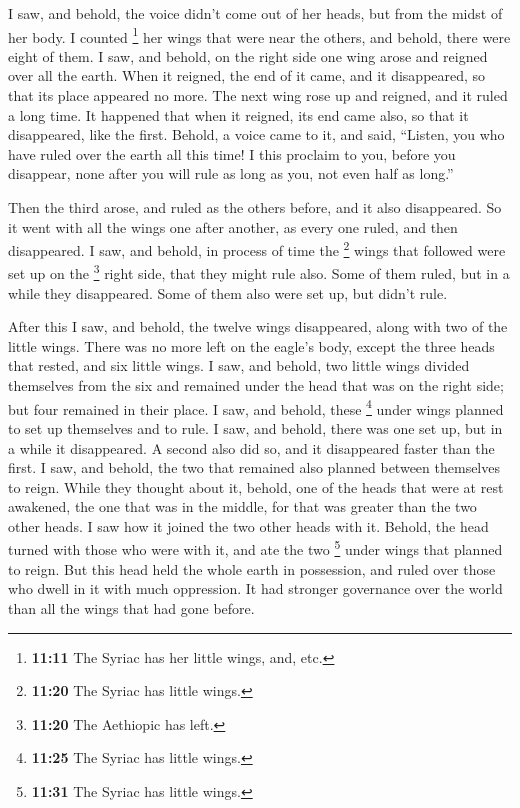  I saw, and behold, the voice didn't come out of her
heads, but from the midst of her body.  I counted
\footnote{\textbf{11:11} The Syriac has her little wings, and, etc.} her
wings that were near the others, and behold, there were eight of them.
 I saw, and behold, on the right side one wing arose and
reigned over all the earth.  When it reigned, the end of
it came, and it disappeared, so that its place appeared no more. The
next wing rose up and reigned, and it ruled a long time. 
It happened that when it reigned, its end came also, so that it
disappeared, like the first.  Behold, a voice came to it,
and said,  ``Listen, you who have ruled over the earth
all this time! I this proclaim to you, before you disappear,
 none after you will rule as long as you, not even half
as long.''

 Then the third arose, and ruled as the others before,
and it also disappeared.  So it went with all the wings
one after another, as every one ruled, and then disappeared.
 I saw, and behold, in process of time the \footnote{\textbf{11:20}
  The Syriac has little wings.} wings that followed were set up on the
\footnote{\textbf{11:20} The Aethiopic has left.} right side, that they
might rule also. Some of them ruled, but in a while they disappeared.
 Some of them also were set up, but didn't rule.

 After this I saw, and behold, the twelve wings
disappeared, along with two of the little wings.  There
was no more left on the eagle's body, except the three heads that
rested, and six little wings.  I saw, and behold, two
little wings divided themselves from the six and remained under the head
that was on the right side; but four remained in their place.
 I saw, and behold, these \footnote{\textbf{11:25} The
  Syriac has little wings.} under wings planned to set up themselves and
to rule.  I saw, and behold, there was one set up, but in
a while it disappeared.  A second also did so, and it
disappeared faster than the first.  I saw, and behold,
the two that remained also planned between themselves to reign.
 While they thought about it, behold, one of the heads
that were at rest awakened, the one that was in the middle, for that was
greater than the two other heads.  I saw how it joined
the two other heads with it.  Behold, the head turned
with those who were with it, and ate the two \footnote{\textbf{11:31}
  The Syriac has little wings.} under wings that planned to reign.
 But this head held the whole earth in possession, and
ruled over those who dwell in it with much oppression. It had stronger
governance over the world than all the wings that had gone before.

